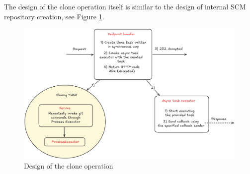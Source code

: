 \documentclass[../main.tex]{subfiles}
\begin{document}
The design of the clone operation itself is similar to the design of internal SCM repository creation, see Figure \ref{fig:clone-design}.

\begin{figure}
  \begin{center}
    \includegraphics[width=\textwidth]{images/clone-design.png}
  \end{center}
  \caption{Design of the clone operation}
  \label{fig:clone-design}
\end{figure}
\end{document}
